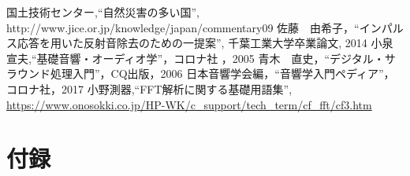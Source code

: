 \documentclass[a4j,11pt]{jsarticle}
\begin{document}
\newpage

\begin{thebibliography}{99}

国土技術センター,``自然災害の多い国'',
http://www.jice.or.jp/knowledge/japan/commentary09
佐藤　由希子，``インパルス応答を用いた反射音除去のための一提案'', 千葉工業大学卒業論文, 2014
小泉　宣夫,``基礎音響・オーディオ学''，コロナ社 ，2005
青木　直史，``デジタル・サラウンド処理入門''，CQ出版，2006
日本音響学会編，``音響学入門ペディア''，コロナ社，2017
小野測器,``FFT解析に関する基礎用語集'',
\url{https://www.onosokki.co.jp/HP-WK/c_support/tech_term/cf_fft/cf3.htm}

\end{thebibliography}

\newpage
\section*{付録}
\end{document}
